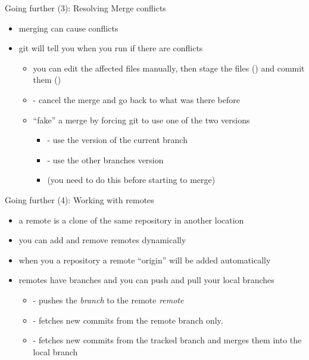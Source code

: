 \begin{frame}{Going further (3): Resolving Merge conflicts}
  \begin{itemize}
    \item merging can cause conflicts
    \item git will tell you when you run  if there are conflicts
    \begin{itemize}
      \item you can edit the affected files manually, then stage the files () and commit them ()
      \item {} - cancel the merge and go back to what was there before
      \item ``fake'' a merge by forcing git to use one of the two versions
      \begin{itemize}
        \item {} - use the version of the current branch
        \item {} - use the other branches version
        \item (you need to do this before starting to merge)
      \end{itemize}
    \end{itemize}
  \end{itemize}
\end{frame}

\begin{frame}{Going further (4): Working with remotes}
  \begin{itemize}
    \item a remote is a clone of the same repository in another location
    \item you can add and remove remotes dynamically
    \item when you  a repository a remote ``origin'' will be added automatically
    \item remotes have branches and you can push and pull your local branches
    \begin{itemize}
      \item {} - pushes the \textit{branch} to the remote \textit{remote}
      \item {} - fetches new commits from the remote branch only. 
      \item {} - fetches new commits from the tracked branch and merges them into the local branch
    \end{itemize}  
  \end{itemize}
\end{frame}

